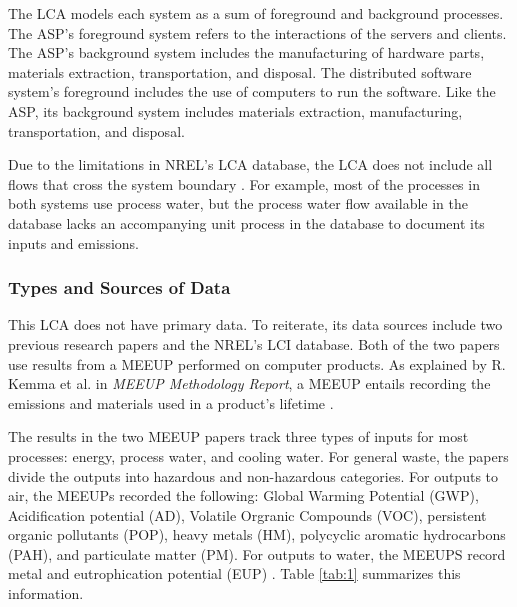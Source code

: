 \documentclass[final,journal,10pt,letterpaper,oneside,twocolumn,compsoc]%
{IEEEtran}
\begin{document}
The LCA models each system as a sum of foreground and background processes. The
ASP's foreground system refers to the interactions of the servers and
clients. The ASP's background system includes the manufacturing
of hardware parts, materials
extraction, transportation, and disposal. The distributed software system's
foreground
includes the use of computers to run the software. Like the ASP, its
background
system includes materials extraction, manufacturing, transportation, and
disposal.

Due to the limitations in NREL's LCA database, the LCA does not include all
flows that cross the system boundary \cite{database}. For example, most of the
processes in
both systems use process water, but the process water flow available in the
database lacks an accompanying unit process in the database to document its
inputs and emissions.

\subsubsection{Types and Sources of Data}
This LCA does not have primary data. To reiterate, its data sources include two
previous research papers
and the NREL's LCI database. Both of the two papers use results from a
MEEUP performed on
computer products. As explained by R. Kemma et al. in \textit{MEEUP Methodology
Report}, a MEEUP entails recording the emissions and materials used
in a product's lifetime \cite{meeup}.

The results in the two MEEUP papers track
three types of inputs for most processes: energy, process
water, and cooling water. For general waste, the papers divide the outputs
into hazardous and non-hazardous categories. For outputs to air, the MEEUPs
recorded the following: Global Warming Potential (GWP), Acidification
potential (AD), Volatile Orgranic Compounds (VOC), persistent organic
pollutants (POP), heavy
metals (HM), polycyclic aromatic hydrocarbons (PAH), and particulate matter
(PM). For outputs to
water, the MEEUPS record metal and eutrophication potential (EUP) \cite{client}
\cite{desktop}. Table \ref{tab:1} summarizes this information.
\end{document}
